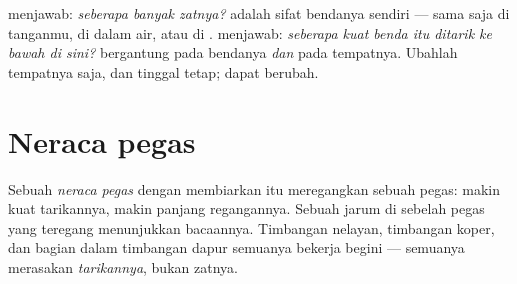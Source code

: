\begin{example}\label{ex:g4:weight-and-mass:cousins}
 menjawab: \emph{seberapa banyak zatnya?}  adalah sifat
bendanya sendiri --- sama saja di tanganmu, di dalam air, atau di
.  menjawab: \emph{seberapa kuat benda itu ditarik ke bawah
di sini?}  bergantung pada bendanya \emph{dan} pada tempatnya.
Ubahlah tempatnya saja, dan  tinggal tetap;  dapat
berubah.
\end{example}

\section{Neraca pegas}

\begin{definition}\label{def:g4:weight-and-mass:springscale}
Sebuah \emph{neraca pegas}   dengan
membiarkan  itu meregangkan sebuah pegas: makin kuat tarikannya,
makin panjang regangannya. Sebuah jarum di sebelah pegas yang teregang
menunjukkan bacaannya. Timbangan nelayan, timbangan koper, dan bagian
dalam timbangan dapur semuanya bekerja begini --- semuanya merasakan
\emph{tarikannya}, bukan zatnya.
\end{definition}


